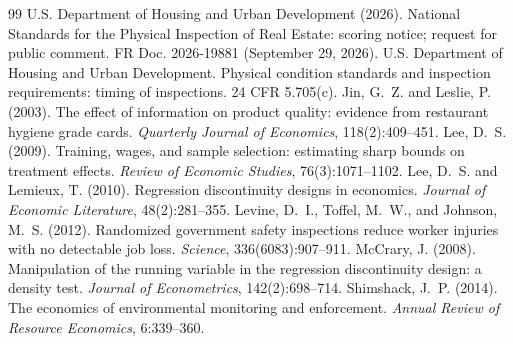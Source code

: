 \documentclass[11pt,letterpaper]{article}
\begin{document}
\begin{thebibliography}{99}
 U.S. Department of Housing and Urban Development (2026). National Standards for the Physical Inspection of Real Estate: scoring notice; request for public comment. FR Doc. 2026-19881 (September 29, 2026).
 U.S. Department of Housing and Urban Development. Physical condition standards and inspection requirements: timing of inspections. 24 CFR 5.705(c).
 Jin, G.~Z. and Leslie, P. (2003). The effect of information on product quality: evidence from restaurant hygiene grade cards. \emph{Quarterly Journal of Economics}, 118(2):409--451.
 Lee, D.~S. (2009). Training, wages, and sample selection: estimating sharp bounds on treatment effects. \emph{Review of Economic Studies}, 76(3):1071--1102.
 Lee, D.~S. and Lemieux, T. (2010). Regression discontinuity designs in economics. \emph{Journal of Economic Literature}, 48(2):281--355.
 Levine, D.~I., Toffel, M.~W., and Johnson, M.~S. (2012). Randomized government safety inspections reduce worker injuries with no detectable job loss. \emph{Science}, 336(6083):907--911.
 McCrary, J. (2008). Manipulation of the running variable in the regression discontinuity design: a density test. \emph{Journal of Econometrics}, 142(2):698--714.
 Shimshack, J.~P. (2014). The economics of environmental monitoring and enforcement. \emph{Annual Review of Resource Economics}, 6:339--360.
\end{thebibliography}
\end{document}
